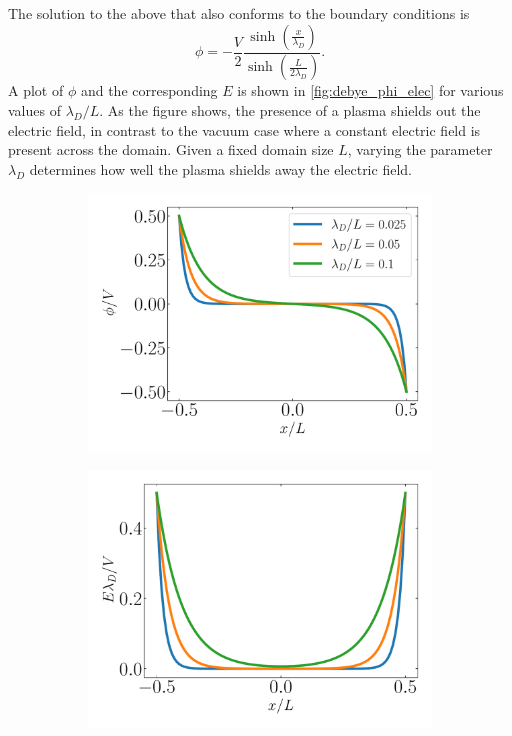 \documentclass[a4paper,11pt]{report}
\begin{document}
The solution to the above that also conforms to the boundary conditions is
\begin{equation}
    \phi = -\frac{V}{2} \frac{\sinh \left (\frac{x}{\lambda_D} \right )}{\sinh \left ( \frac{L}{2\lambda_D} \right )}.
\end{equation}
A plot of $\phi$ and the corresponding $E$ is shown in \cref{fig:debye_phi_elec} for various values of $\lambda_D/L$. As the figure shows, the presence of a plasma shields out the electric field, in contrast to the vacuum case where a constant electric field is present across the domain. Given a fixed domain size $L$, varying the parameter $\lambda_D$ determines how well the plasma shields away the electric field. 
\begin{figure}
    \centering
    \begin{subfigure}[b]{0.45\textwidth}
        \centering
        \includegraphics[width=\textwidth]{../../images/debye_phi.pdf}
        \caption{}
        \label{fig:debye_phi}
    \end{subfigure}
    \begin{subfigure}[b]{0.45\textwidth}
        \centering
        \includegraphics[width=\textwidth]{../../images/debye_elec.pdf}

\end{subfigure}
\end{figure}
\end{document}
